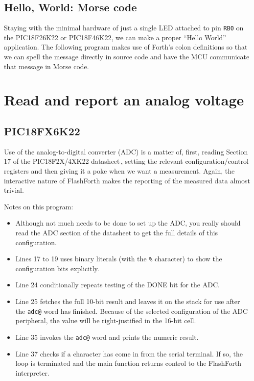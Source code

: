 \documentclass[12pt,a4paper]{article}
\newcommand{\code}[2]{
 \hrulefill
 \scriptsize
 
 \hrulefill
 \vspace{2em}
 \normalsize
}
\begin{document}
\newpage
\subsection{Hello, World: Morse code}
%
Staying with the minimal hardware of just a single LED attached to pin \verb!RB0! 
on the PIC18F26K22 or PIC18F46K22, 
we can make a proper ``Hello World'' application.
The following program makes use of Forth's colon definitions so that we can 
spell the message directly in source code and 
have the MCU communicate that message in Morse code.

\bigskip\noindent
\code{}{../pic18/hello-world.txt}



\newpage
\section{Read and report an analog voltage}

\subsection{PIC18FX6K22}
%
Use of the analog-to-digital converter (ADC) is a matter of, first,
reading Section 17 of the PIC18F2X/4XK22 datasheet\,\cite{pic18f26k22-datasheet},
setting the relevant configuration/control registers and then giving it a poke
when we want a measurement.
Again, the interactive nature of FlashForth makes the reporting 
of the measured data almost trivial.

\bigskip\noindent
\code{}{../pic18/read-adc.txt}

\noindent
Notes on this program:
\begin{itemize}
 \item Although not much needs to be done to set up the ADC, 
  you really should read the ADC section of the datasheet
  to get the full details of this configuration.
 \item Lines 17 to 19 uses binary literals (with the \verb!%! character) 
  to show the configuration bits explicitly.
 \item Line 24 conditionally repeats testing of the DONE bit for the ADC.
 \item Line 25 fetches the full 10-bit result and leaves it on the stack
  for use after the \verb!adc@! word has finished.  
  Because of the selected configuration of the ADC peripheral, 
  the value will be right-justified in the 16-bit cell.
 \item Line 35 invokes the \verb!adc@! word and prints the numeric result.
 \item Line 37 checks if a character has come in from the serial terminal.
  If so, the loop is terminated and the main function returns control to
  the FlashForth interpreter.
\end{itemize}
\end{document}
